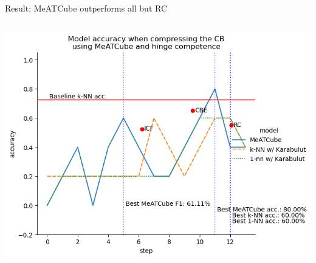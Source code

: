 \documentclass[]{beamer}
\begin{document}
\begin{frame}{Result: MeATCube outperforms all but RC}
\begin{columns}
\begin{column}{.65\textwidth}
            \includegraphics[width=.8\textwidth]{../results-weight-estim+/figs/lenses}
        \end{column}
    \end{columns}
\end{frame}
\end{document}

